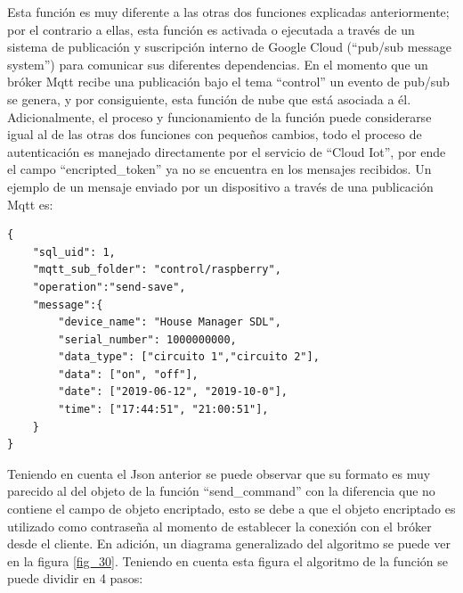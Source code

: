 Esta función es muy diferente a las otras dos funciones explicadas anteriormente; por el contrario a ellas, esta función es activada o ejecutada a través de un sistema de publicación y suscripción interno de Google Cloud (``pub/sub message system'') para comunicar sus diferentes dependencias. En el momento que un bróker Mqtt recibe una publicación bajo el tema ``control'' un evento de pub/sub se genera, y por consiguiente, esta función de nube que está asociada a él. 
\vspace{0.5cm}\\
Adicionalmente, el proceso y funcionamiento de la función puede considerarse igual al de las otras dos funciones con pequeños cambios, todo el proceso de autenticación es manejado directamente por el servicio de ``Cloud Iot'', por ende el campo ``encripted\_token'' ya no se encuentra en los mensajes recibidos. Un ejemplo de un mensaje enviado por un dispositivo a través de una publicación Mqtt es:
\begin{Verbatim}[tabsize=4]
{
	"sql_uid": 1, 
	"mqtt_sub_folder": "control/raspberry",
	"operation":"send-save",
	"message":{
		"device_name": "House Manager SDL",
		"serial_number": 1000000000,
		"data_type": ["circuito 1","circuito 2"],
		"data": ["on", "off"],
		"date": ["2019-06-12", "2019-10-0"],
		"time": ["17:44:51", "21:00:51"],
	}
}
\end{Verbatim}
Teniendo en cuenta el Json anterior se puede observar que su formato es muy parecido al del objeto de la función ``send\_command'' con la diferencia que no contiene el campo de objeto encriptado, esto se debe a que el objeto encriptado es utilizado como contraseña al momento de establecer la conexión con el bróker desde el cliente. En adición, un diagrama generalizado del algoritmo se puede ver en la figura \ref{fig_30}. Teniendo en cuenta esta figura el algoritmo de la función se puede dividir en 4 pasos:

